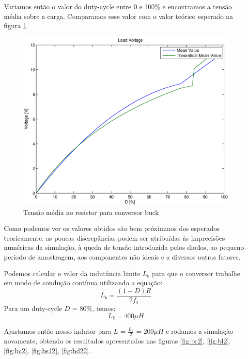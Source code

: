 \documentclass{article}
\begin{document}
Variamos então o valor do duty-cycle entre 0 e 100\% e encontramos a tensão média sobre a carga. Comparamos esse valor com o valor teórico esperado na figura \ref{fig:buvrxd}
\begin{figure}[H]
	\centering
	\includegraphics[width=0.7\linewidth]{matlab/buck/r_vrxd}
	\caption{Tensão média no resistor para conversor buck}
	\label{fig:buvrxd}
\end{figure}

Como podemos ver os valores obtidos são bem próximmos dos esperados teoricamente, as poucas discrepâncias podem ser atribuídas às imprecisões numéricas da simulação, à queda de tensão introduzida pelos diodos, ao pequeno período de amostragem, aos componentes não ideais e a diversos outros fatores.

Podemos calcular o valor da indutância limite $L_b$ para que o conversor trabalhe em modo de condução contínua utilizando a equação:
\begin{equation}
	L_b = \frac{(1 - D)R}{2f_s}
\end{equation}
Para um duty-cycle $D$ = $80\%$, temos:
\begin{equation}
	L_b = 400\mu H
\end{equation}

Ajustamos então nosso indutor para $L$ = $\frac{L_b}{2}$ = $200 \mu H$ e rodamos a simulação novamente, obtendo os resultados apresentados nas figuras \ref{fig:br2}, \ref{fig:bl2}, \ref{fig:bc2}, \ref{fig:bs12}, \ref{fig:bd22}.
\end{document}
